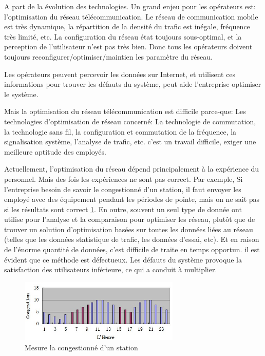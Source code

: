 A part de la évolution des technologies. Un grand enjeu pour les opérateurs est: l'optimisation du réseau télécommunication. Le réseau de communication mobile est très dynamique, la répartition de la densité du trafic est inégale, fréquence très limité, etc. La configuration du réseau état toujours sous-optimal, et la perception de l'utilisateur n'est pas très bien. Donc tous les opérateurs doivent toujours reconfigurer/optimiser/maintien les paramètre du réseau.
  
Les opérateurs peuvent percevoir les données sur Internet, et utilisent ces informations pour trouver les défauts du système, peut aide l'entreprise optimiser le système.

Mais la optimisation du réseau télécommunication est difficile parce-que: Les technologies d'optimisation de réseau concerné: La technologie de commutation, la technologie sans fil, la configuration et commutation de la fréquence, la signalisation système, l'analyse de trafic, etc. c'est un travail difficile, exiger une meilleure aptitude des employés.  

Actuellement, l'optimisation du réseau dépend principalement à la expérience du personnel. Mais des fois les expériences ne sont pas correct. Par exemple, Si l'entreprise besoin de savoir le congestionné d'un station, il faut envoyer les employé avec des équipement pendant les périodes de pointe, mais on ne sait pas si les résultats sont correct \ref{meseau}.  En outre, souvent un seul type de  donnée ont utilise pour l'analyse et la comparaison pour optimiser les réseau, plutôt que de trouver un solution d'optimisation basées sur toutes les données liées au réseau (telles que les données statistique de trafic, les données d'essai, etc). Et en raison de l'énorme quantité de données, c'est difficile de traite en temps opportun. il est évident que ce méthode est défectueux. Les défauts du système provoque la satisfaction des utilisateurs inférieure, ce qui a conduit à multiplier.
      \begin{figure}[H]
          \centering
          \includegraphics[width=3in]{images/meseau.jpg}
          \caption{Mesure la congestionné d'un station}
          \label{meseau}
      \end{figure}
      

